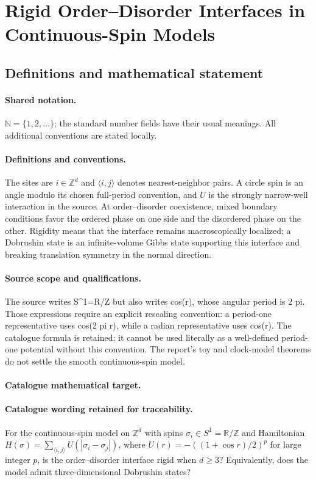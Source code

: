 \documentclass[11pt]{article}
\begin{document}
\section{Rigid Order–Disorder Interfaces in Continuous-Spin Models}\label{statement}

\subsection{Definitions and mathematical statement}

\paragraph{Shared notation.}$\mathbb N=\{1,2,\ldots\}$; the standard number fields have their usual meanings. All additional conventions are stated locally.


\paragraph{Definitions and conventions.} The sites are $i\in\mathbb Z^d$ and $\langle i,j\rangle$ denotes nearest-neighbor pairs. A circle spin is an angle modulo its chosen full-period convention, and $U$ is the strongly narrow-well interaction in the source. At order--disorder coexistence, mixed boundary conditions favor the ordered phase on one side and the disordered phase on the other. Rigidity means that the interface remains macroscopically localized; a Dobrushin state is an infinite-volume Gibbs state supporting this interface and breaking translation symmetry in the normal direction.

\paragraph{Source scope and qualifications.} The source writes S^1=R/Z but also writes cos(r), whose angular period is 2 pi. Those expressions require an explicit rescaling convention: a period-one representative uses cos(2 pi r), while a radian representative uses cos(r). The catalogue formula is retained; it cannot be used literally as a well-defined period-one potential without this convention. The report's toy and clock-model theorems do not settle the smooth continuous-spin model.

\paragraph{Catalogue mathematical target.}
\paragraph{Catalogue wording retained for traceability.}
For the continuous-spin model on $\mathbb Z^d$ with spins $\sigma_i\in S^1=\mathbb R/\mathbb Z$ and Hamiltonian $H(\sigma)=\sum_{\langle i,j\rangle}U(|\sigma_i-\sigma_j|)$, where $U(r)=-((1+\cos r)/2)^p$ for large integer $p$, is the order–disorder interface rigid when $d\geq3$? Equivalently, does the model admit three-dimensional Dobrushin states?
\end{document}
